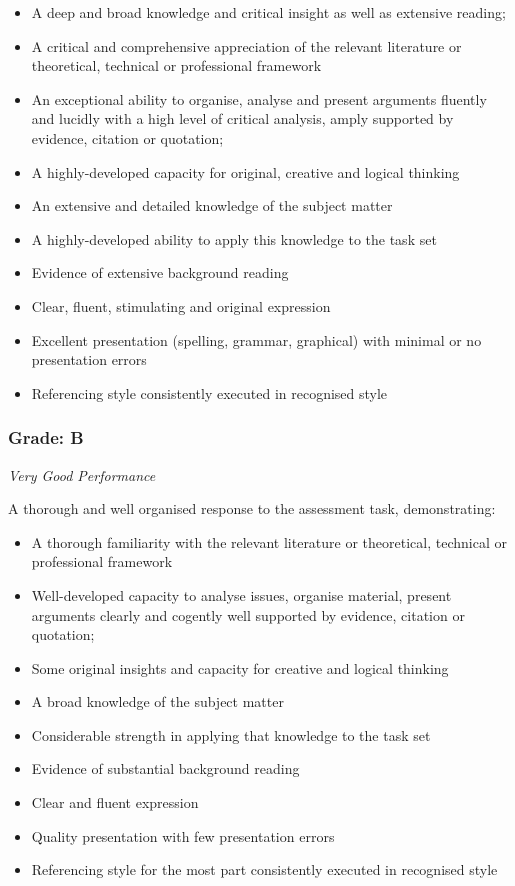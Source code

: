 \begin{itemize}
	\item A deep and broad knowledge and critical insight as well as extensive reading;
	\item A critical and comprehensive appreciation
	of the relevant literature or theoretical, technical or professional framework
	\item An exceptional ability to organise, analyse and present arguments fluently and lucidly with a high level of critical analysis, amply supported by evidence, citation or quotation;
	\item A highly-developed capacity for original,
	creative and logical thinking
	\item An extensive and detailed knowledge of the subject matter
	\item A highly-developed ability to apply this knowledge to the task set
	\item Evidence of extensive background reading
	\item Clear, fluent, stimulating and original expression
	\item Excellent presentation (spelling, grammar, graphical) with minimal or no presentation errors
	\item Referencing style consistently executed in recognised style
\end{itemize}

\subsubsection*{Grade: B}

\textit{Very Good Performance}

A thorough and well organised response to the assessment task, demonstrating:

\begin{itemize}
	\item A thorough familiarity with the relevant literature or theoretical, technical or professional framework
	\item Well-developed capacity to analyse issues, organise material, present arguments clearly and cogently well supported by evidence, citation or quotation;
	\item Some original insights and capacity for creative and logical thinking
	\item A broad knowledge of the subject matter
	\item Considerable strength in applying that knowledge to the task set
	\item Evidence of substantial background reading
	\item Clear and fluent expression
	\item Quality presentation with few presentation errors
	\item Referencing style for the most part consistently executed in recognised style
\end{itemize}

